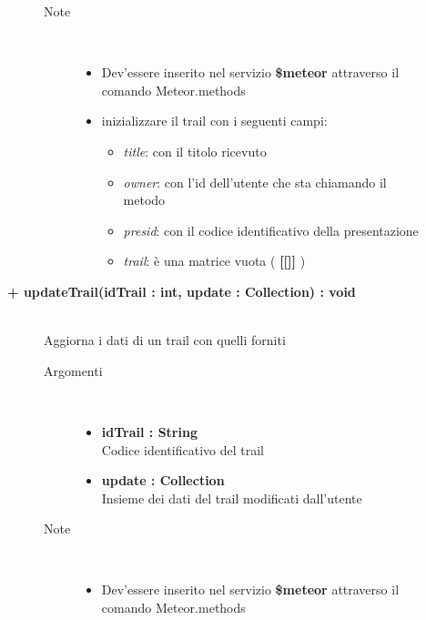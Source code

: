 \begin{description}
\begin{description}
\begin{description}
\begin{itemize}
				\end{itemize}
			\item[Note] \hfill \\
			\begin{itemize}
					\item Dev'essere inserito nel servizio \textbf{\$meteor} attraverso il comando Meteor.methods
					\item inizializzare il trail con i seguenti campi:
					\begin{itemize}
					\item \textit{title}: con il titolo ricevuto
					\item \textit{owner}: con l'id dell'utente che sta chiamando il metodo
					\item \textit{presid}: con il codice identificativo della presentazione
					\item \textit{trail}: è una matrice vuota ( \textbf{[[]]} )
					\end{itemize}
				\end{itemize}
		\end{description}
	\end{description}
	
	\begin{description}
		\item[\textbf{\color{blue}+ updateTrail(idTrail : int, update : Collection) : void			}] \hfill \\
			Aggiorna i dati di un trail con quelli forniti
			
		\begin{description}
			\item[Argomenti] \hfill \\
				\begin{itemize}
				
					\item \textbf{idTrail : String		} \hfill \\
					Codice identificativo del trail
					\item \textbf{update : Collection		} \hfill \\
					Insieme dei dati del trail modificati dall'utente
					
				\end{itemize}
			\item[Note] \hfill \\
			\begin{itemize}
					\item Dev'essere inserito nel servizio \textbf{\$meteor} attraverso il comando Meteor.methods
				\end{itemize}
		\end{description}
	\end{description}
	

\end{description}

